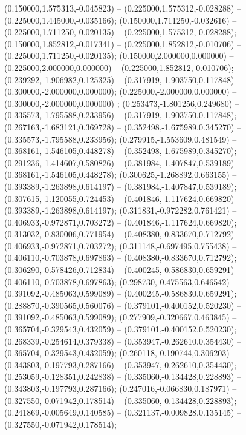  (0.150000,1.575313,-0.045823) -- (0.225000,1.575312,-0.028288) -- (0.225000,1.445000,-0.035166);
 (0.150000,1.711250,-0.032616) -- (0.225000,1.711250,-0.020135) -- (0.225000,1.575312,-0.028288);
 (0.150000,1.852812,-0.017341) -- (0.225000,1.852812,-0.010706) -- (0.225000,1.711250,-0.020135);
 (0.150000,2.000000,0.000000) -- (0.225000,2.000000,0.000000) -- (0.225000,1.852812,-0.010706);
 (0.239292,-1.906982,0.125325) -- (0.317919,-1.903750,0.117848) -- (0.300000,-2.000000,0.000000);
 (0.225000,-2.000000,0.000000) -- (0.300000,-2.000000,0.000000) ;
 (0.253473,-1.801256,0.249680) -- (0.335573,-1.795588,0.233956) -- (0.317919,-1.903750,0.117848);
 (0.267163,-1.683121,0.369728) -- (0.352498,-1.675989,0.345270) -- (0.335573,-1.795588,0.233956);
 (0.279915,-1.553609,0.481549) -- (0.368161,-1.546105,0.448278) -- (0.352498,-1.675989,0.345270);
 (0.291236,-1.414607,0.580826) -- (0.381984,-1.407847,0.539189) -- (0.368161,-1.546105,0.448278);
 (0.300625,-1.268892,0.663155) -- (0.393389,-1.263898,0.614197) -- (0.381984,-1.407847,0.539189);
 (0.307615,-1.120055,0.724453) -- (0.401846,-1.117624,0.669820) -- (0.393389,-1.263898,0.614197);
 (0.311831,-0.972282,0.761421) -- (0.406933,-0.972871,0.703272) -- (0.401846,-1.117624,0.669820);
 (0.313032,-0.830006,0.771954) -- (0.408380,-0.833670,0.712792) -- (0.406933,-0.972871,0.703272);
 (0.311148,-0.697495,0.755438) -- (0.406110,-0.703878,0.697863) -- (0.408380,-0.833670,0.712792);
 (0.306290,-0.578426,0.712834) -- (0.400245,-0.586830,0.659291) -- (0.406110,-0.703878,0.697863);
 (0.298730,-0.475563,0.646542) -- (0.391092,-0.485063,0.599089) -- (0.400245,-0.586830,0.659291);
 (0.288870,-0.390565,0.560076) -- (0.379101,-0.400152,0.520230) -- (0.391092,-0.485063,0.599089);
 (0.277909,-0.320667,0.463845) -- (0.365704,-0.329543,0.432059) -- (0.379101,-0.400152,0.520230);
 (0.268339,-0.254614,0.379338) -- (0.353947,-0.262610,0.354430) -- (0.365704,-0.329543,0.432059);
 (0.260118,-0.190744,0.306203) -- (0.343803,-0.197793,0.287166) -- (0.353947,-0.262610,0.354430);
 (0.253059,-0.128351,0.242838) -- (0.335060,-0.134428,0.228893) -- (0.343803,-0.197793,0.287166);
 (0.247016,-0.066830,0.187971) -- (0.327550,-0.071942,0.178514) -- (0.335060,-0.134428,0.228893);
 (0.241869,-0.005649,0.140585) -- (0.321137,-0.009828,0.135145) -- (0.327550,-0.071942,0.178514);
